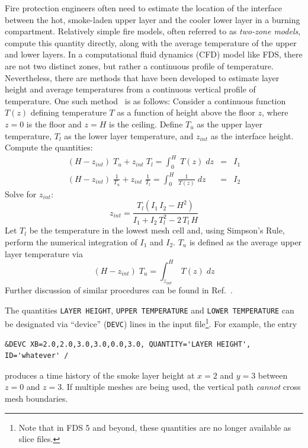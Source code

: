 \documentclass[11pt]{book}
\newcommand{\ct}{\tt\small}
\newcommand{\be}{\begin{equation}}
\newcommand{\ee}{\end{equation}}
\begin{document}
Fire protection engineers often need to estimate the location of the interface between
the hot, smoke-laden upper layer and the cooler lower layer in a burning compartment.
Relatively simple fire models, often referred to as {\em two-zone models}, compute
this quantity directly, along with the average temperature of the upper and lower layers.
In a computational fluid dynamics (CFD) model like FDS, there are not two distinct zones,
but rather a continuous profile of temperature. Nevertheless, there are methods that
have been developed to estimate layer height and average temperatures from a continuous
vertical profile of temperature. One such method~\cite{Janssens:JFS1992} is as follows:
Consider a continuous function $T(z)$ defining temperature $T$ as a function of height above
the floor $z$, where $z=0$ is the floor and $z=H$ is the ceiling. Define $T_u$ as the
upper layer temperature, $T_l$ as the lower layer temperature, and $z_{int}$ as the
interface height. Compute the quantities:
\begin{eqnarray*} (H-z_{int})\; T_u + z_{int} \; T_l = \int_0^H \; T(z) \; dz &=& I_1 \\
                  (H-z_{int})\; \frac{1}{T_u} + z_{int} \; \frac{1}{T_l} = \int_0^H \; \frac{1}{T(z)} \; dz &=& I_2 \end{eqnarray*}
Solve for $z_{int}$:
\be z_{int} = \frac{ T_l(I_1 \, I_2 - H^2)}{I_1+I_2 \, T_l^2 - 2\, T_l \, H} \ee
Let $T_l$ be the temperature in the lowest mesh cell and, using Simpson's Rule, perform the
numerical integration of $I_1$ and $I_2$. $T_u$ is defined as the average upper layer
temperature via
\be (H-z_{int})\; T_u = \int_{z_{int}}^H \; T(z) \; dz \ee
Further discussion of similar procedures can be found in Ref.~\cite{He:1}.

The quantities {\ct LAYER HEIGHT}, {\ct UPPER TEMPERATURE} and {\ct LOWER TEMPERATURE}
can be designated via ``device'' ({\ct DEVC}) lines in the input file\footnote{Note that in FDS 5 and beyond, these quantities
are no longer available as slice files.}. For example, the entry

\footnotesize
\begin{verbatim}
&DEVC XB=2.0,2.0,3.0,3.0,0.0,3.0, QUANTITY='LAYER HEIGHT', ID='whatever' /
\end{verbatim}
\normalsize

\noindent
produces a time history of the smoke layer height at $x=2$ and $y=3$ between $z=0$ and $z=3$.
If multiple meshes are being used, the vertical path {\em cannot} cross mesh boundaries.
\end{document}

